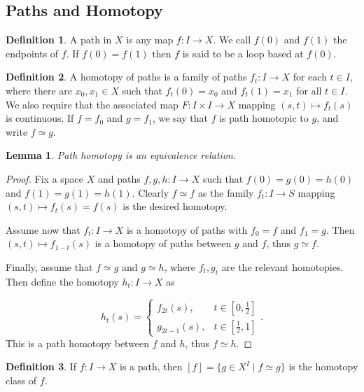 \documentclass{report}
\newtheorem{lemma}{Lemma}[section]
\theoremstyle{definition}
\newtheorem{definition}{Definition}[section]
\theoremstyle{remark}
\newcommand{\set}[1]{\{#1\}}
\begin{document}
\subsection{Paths and Homotopy}

\begin{definition}
   A path in $X$ is any map $f : I \to X$. We call $f(0)$ and $f(1)$ the endpoints of $f$. If $f(0)=f(1)$ then $f$ is said to be a loop based at $f(0)$.
\end{definition}

\begin{definition}
   A homotopy of paths is a family of paths $f_t : I \to X$ for each $t \in I$, where there are $x_0, x_1 \in X$ such that $f_t(0) = x_0$ and $f_t(1) = x_1$ for all $t \in I$. We also require that the associated map $F : I \times I \to X$ mapping $(s, t) \mapsto f_t(s)$ is continuous. If $f = f_0$ and $g = f_1$, we say that $f$ is path homotopic to $g$, and write $f \simeq g$.
\end{definition}

\begin{lemma}
    Path homotopy is an equivalence relation.
\end{lemma}

\begin{proof}
    Fix a space $X$ and paths $f, g, h : I \to X$ such that $f(0)=g(0)=h(0)$ and $f(1)=g(1)=h(1)$. Clearly $f \simeq f$ as the family $f_t : I \to S$ mapping $(s, t) \mapsto f_t(s) = f(s)$ is the desired homotopy.
    
    Assume now that $f_t : I \to X$ is a homotopy of paths with $f_0 = f$ and $f_1 = g$. Then $(s, t) \mapsto f_{1-t}(s)$ is a homotopy of paths between $g$ and $f$, thus $g \simeq f$.
    
    Finally, assume that $f \simeq g$ and $g \simeq h$, where $f_t, g_t$ are the relevant homotopies. Then define the homotopy $h_t : I \to X$ as
    
    \begin{equation*}
        h_t(s) = \begin{cases}
        f_{2t}(s), & t \in [0, \frac{1}{2}] \\
        g_{2t-1}(s), & t \in [\frac{1}{2}, 1]
        \end{cases}.
    \end{equation*} This is a path homotopy between $f$ and $h$, thus $f \simeq h$.
\end{proof}

\begin{definition}
   If $f : I \to X$ is a path, then $[f] = \set{g \in X^I \mid f \simeq g}$ is the homotopy class of $f$.
\end{definition}
\end{document}
